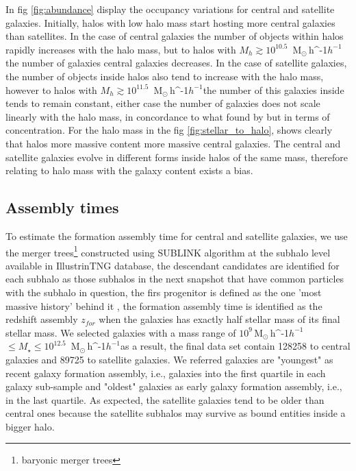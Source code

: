\documentclass[a4paper,fleqn,usenatbib]{mnras}
\newcommand{\Msunh}{\,{\rm M}$_{\odot}$\,\ifmmode h^{-1}\else $h^{-1}$\fi}
\begin{document}
In fig \ref{fig:abundance} display the occupancy variations for central and satellite galaxies. Initially, halos with low halo mass start hosting more central galaxies than satellites. In the case of central galaxies the number of objects within halos rapidly increases with the halo mass, but to halos with $M_h \gtrsim 10^{10.5}$ \Msunh the number of galaxies central galaxies decreases. In the case of satellite galaxies, the number of objects inside halos also tend to increase with the halo mass, however to halos with $M_h \gtrsim 10^{11.5}$ \Msunh the number of this galaxies inside tends to remain constant, either case the number of galaxies does not scale linearly with the halo mass, in concordance to what found by \citet{2019ApJ...887...17Z} but in terms of concentration. For the halo mass in the fig \ref{fig:stellar_to_halo}, shows clearly that halos more massive content more massive central galaxies. The central and satellite galaxies evolve in different forms inside halos of the same mass, therefore relating to halo mass with the galaxy content exists a bias.\\

\subsection{Assembly times}
\label{sec:assembly_times}
To estimate the formation assembly time for central and satellite galaxies, we use the merger trees\footnote{baryonic merger trees} constructed using SUBLINK algorithm at the subhalo level available in IllustrinTNG database, the descendant candidates are identified for each subhalo as those subhalos in the next snapshot that have common particles with the subhalo in question, the firs progenitor is defined as the one 'most massive history' behind it \citep{2015MNRAS.449...49R}, the formation assembly time is identified as the redshift assembly $z_{for}$ when the galaxies has exactly half stellar mass of its final stellar mass. We selected galaxies with a mass range of $10^{9}$\Msunh $\leq M_{\star} \leq 10^{12.5}$ \Msunh as a result, the final data set contain 128258 to central galaxies and 89725 to satellite galaxies. We referred galaxies are "youngest" as recent galaxy formation assembly, i.e., galaxies into the first quartile in each galaxy sub-sample and "oldest" galaxies as early galaxy formation assembly, i.e., in the last quartile. As expected, the satellite galaxies tend to be older than central ones because the satellite subhalos may survive as bound entities inside a bigger halo.\\
\end{document}
